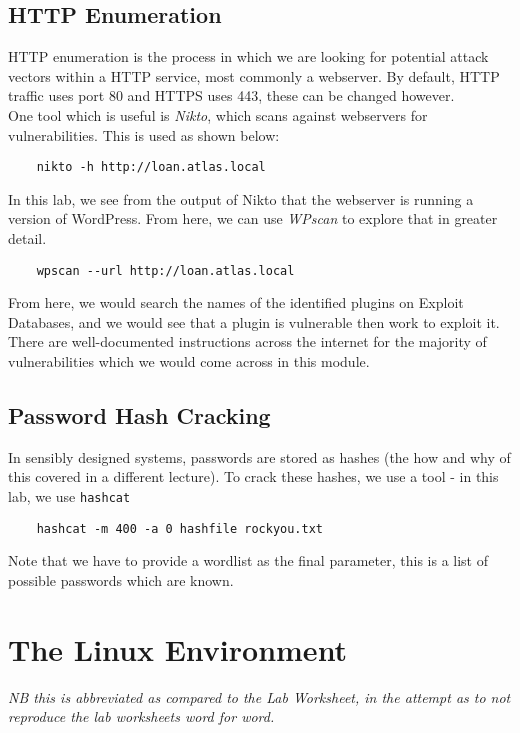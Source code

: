 \subsection{HTTP Enumeration}
HTTP enumeration is the process in which we are looking for potential attack vectors within a HTTP service, most commonly a webserver. By default, HTTP traffic uses port 80 and HTTPS uses 443, these can be changed however.\\

One tool which is useful is \textit{Nikto}, which scans against webservers for vulnerabilities. This is used as shown below:
\begin{verbatim}
    nikto -h http://loan.atlas.local
\end{verbatim}

In this lab, we see from the output of Nikto that the webserver is running a version of WordPress. From here, we can use \textit{WPscan} to explore that in greater detail.
\begin{verbatim}
    wpscan --url http://loan.atlas.local
\end{verbatim}

From here, we would search the names of the identified plugins on Exploit Databases, and we would see that a plugin is vulnerable then work to exploit it. There are well-documented instructions across the internet for the majority of vulnerabilities which we would come across in this module.

\subsection{Password Hash Cracking}
In sensibly designed systems, passwords are stored as hashes (the how and why of this covered in a different lecture). To crack these hashes, we use a tool - in this lab, we use \verb|hashcat|
\begin{verbatim}
    hashcat -m 400 -a 0 hashfile rockyou.txt
\end{verbatim}
Note that we have to provide a wordlist as the final parameter, this is a list of possible passwords which are known. 

\section{The Linux Environment}
\textit{NB this is abbreviated as compared to the Lab Worksheet, in the attempt as to not reproduce the lab worksheets word for word.}\\


